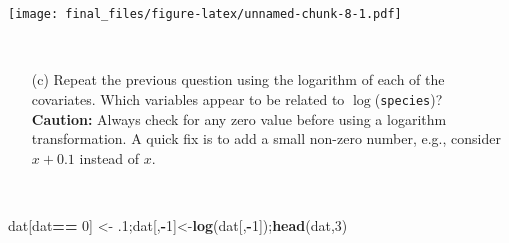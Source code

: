 \documentclass[]{article}
\newenvironment{Shaded}{\begin{snugshade}}{\end{snugshade}}
\newcommand{\KeywordTok}[1]{\textcolor[rgb]{0.13,0.29,0.53}{\textbf{#1}}}
\newcommand{\DataTypeTok}[1]{\textcolor[rgb]{0.13,0.29,0.53}{#1}}
\newcommand{\DecValTok}[1]{\textcolor[rgb]{0.00,0.00,0.81}{#1}}
\newcommand{\StringTok}[1]{\textcolor[rgb]{0.31,0.60,0.02}{#1}}
\newcommand{\ControlFlowTok}[1]{\textcolor[rgb]{0.13,0.29,0.53}{\textbf{#1}}}
\newcommand{\OperatorTok}[1]{\textcolor[rgb]{0.81,0.36,0.00}{\textbf{#1}}}
\newcommand{\NormalTok}[1]{#1}
\begin{document}
\begin{Shaded}
\end{Shaded}

\texttt{[image: final\_files/figure-latex/unnamed-chunk-8-1.pdf]}

~

\begin{itemize}
\item[(c)] Repeat the previous question using the logarithm of each of the covariates. Which variables appear to be related to $\log$({\tt species})?\\
{\bf Caution:} Always check for any zero value before using a logarithm transformation. A quick fix is to add a small non-zero number, e.g., consider $x+0.1$ instead of $x$.
\end{itemize}

~

\begin{Shaded}
\begin{Highlighting}[]
\NormalTok{dat[dat}\OperatorTok{==}\StringTok{ }\DecValTok{0}\NormalTok{] <-}\StringTok{ }\NormalTok{.}\DecValTok{1}\NormalTok{;dat[,}\OperatorTok{-}\DecValTok{1}\NormalTok{]<-}\KeywordTok{log}\NormalTok{(dat[,}\OperatorTok{-}\DecValTok{1}\NormalTok{]);}\KeywordTok{head}\NormalTok{(dat,}\DecValTok{3}\NormalTok{)}
\end{Highlighting}
\end{Shaded}
\end{document}
